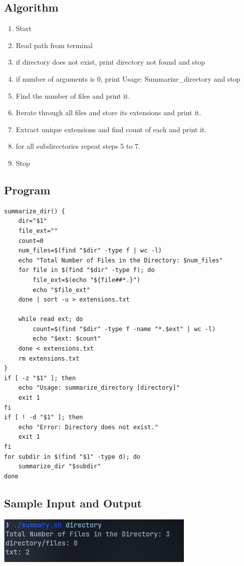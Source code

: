 \subsection{Algorithm}
\begin{enumerate}
   \item Start
   \item Read path from terminal
   \item if directory does not exist, print directory not found and stop
   \item if number of arguments is 0, print Usage: Summarize\_directory and stop
   \item Find the number of files and print it.
   \item Iterate through all files and store its extensions and print it.
   \item Extract unique extensions and find count of each and print it.
   \item for all subdirectories repeat steps 5 to 7.
   \item Stop
\end{enumerate}

\subsection{Program}
\begin{lstlisting}[label={list:c_program:queue}]
summarize_dir() {
    dir="$1"
    file_ext=""
    count=0
    num_files=$(find "$dir" -type f | wc -l)
    echo "Total Number of Files in the Directory: $num_files"
    for file in $(find "$dir" -type f); do
        file_ext=$(echo "${file##*.}")
        echo "$file_ext"
    done | sort -u > extensions.txt
    
    while read ext; do
        count=$(find "$dir" -type f -name "*.$ext" | wc -l)
        echo "$ext: $count"
    done < extensions.txt
    rm extensions.txt
}
if [ -z "$1" ]; then
    echo "Usage: summarize_directory [directory]"
    exit 1
fi
if [ ! -d "$1" ]; then
    echo "Error: Directory does not exist."
    exit 1
fi
for subdir in $(find "$1" -type d); do
    summarize_dir "$subdir"
done
\end{lstlisting}

\subsection{Sample Input and Output}
\includegraphics[width=0.5\linewidth]{Cycle_1//Outputs/summary.png}

